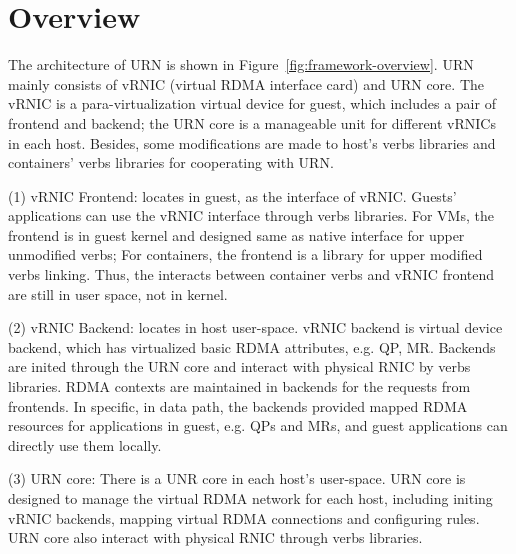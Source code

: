 \section{Overview}
The architecture of URN is shown in Figure~\ref{fig:framework-overview}. URN mainly consists of vRNIC (virtual RDMA interface card) and URN core. The vRNIC is a para-virtualization virtual device for guest, which includes a pair of frontend and backend; the URN core is a manageable unit for different vRNICs in each host. Besides, some modifications are made to host's  verbs libraries and containers' verbs libraries  for cooperating with URN.

(1) vRNIC Frontend: locates in guest, as the interface of vRNIC. Guests' applications can use the vRNIC interface through verbs libraries. For VMs, the frontend is in guest kernel and designed same as native interface for upper unmodified verbs; For containers, the frontend is a library for upper modified verbs linking. Thus, the interacts between container verbs and vRNIC frontend are still in user space, not in kernel.

(2) vRNIC Backend: locates in host user-space. vRNIC backend is virtual device backend, which has virtualized basic RDMA attributes, e.g. QP, MR. Backends are inited through the URN core and interact with physical RNIC by verbs libraries. RDMA contexts are maintained in backends for the requests from frontends. In specific, in data path, the backends provided mapped RDMA resources for applications in guest, e.g. QPs and MRs, and guest applications can directly use them locally.

(3) URN core: There is a UNR core in each host's user-space. URN core is designed to manage the virtual RDMA network for each host, including initing vRNIC backends, mapping virtual RDMA connections and configuring rules. URN core also interact with physical RNIC through verbs libraries. 

